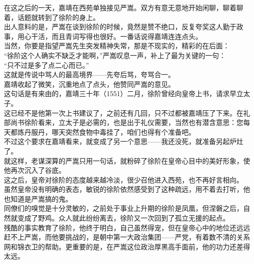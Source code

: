 \begin{multicols}{\theparacolNo}
在这之后的一天，嘉靖在西苑单独接见严嵩。双方有意无意地开始闲聊，聊着聊着，话题就转到了徐阶的身上。\\

出人意料的是，严嵩在谈到徐阶的时候，竟然是赞不绝口，反复夸奖这人勤于政事，用心干活，而且青词写得也很好。一番话说得嘉靖连连点头。\\

当然，你要是指望严嵩先生突发精神失常，那是不现实的，精彩的在后面：\\

“徐阶这个人确实不缺乏才能啊，”严嵩叹息一声，补上了最为关键的一句：\\

“只不过是多了点二心而已。”\\

这就是传说中骂人的最高境界——先夸后骂，夸骂合一。\\

嘉靖收起了微笑，沉重地点了点头，他赞同严嵩的意见。\\

这句话是有来由的，嘉靖三十年（1551）二月，徐阶曾经向皇帝上书，请求早立太子。\\

这已经不是他第一次上书建议了，之前还有几回，只不过都被嘉靖压了下来。在礼部尚书徐阶看来，立太子是必需的，也是出于礼仪需要，当然也有潜含意思：您每天都炼丹服丹，哪天突然食物中毒挂了，咱们也得有个准备吧。\\

不过这个要求在嘉靖看来，就变成了另一个意思——我还没死，就准备另起炉灶了。\\

就这样，老谋深算的严嵩只用一句话，就粉碎了徐阶在皇帝心目中的美好形象，使他再次沉入了谷底。\\

这之后，皇帝对徐阶的态度越来越冷淡，很少召他进入西苑，也不再好言相向。\\

虽然皇帝没有明确的表态，敏锐的徐阶依然感受到了这种疏远，用不着去打听，他也知道是严嵩搞的鬼。\\

同僚们的嗅觉是十分灵敏的，之前处于事业上升期的徐阶是凤凰，但涅磐之后，自然就变成了野鸡。众人就此纷纷离去，徐阶又一次回到了孤立无援的起点。\\

残酷的事实教育了徐阶，他终于明白，自己虽然得宠，但在皇帝心中的地位还远远赶不上严嵩，而他要挑战的，是朝中第一大政治集团——严党，有着数不清的关系网和锦衣卫的帮助。更重要的是，在严嵩这位政治厚黑高手面前，他的功力还差得太远。\\


\end{multicols}

